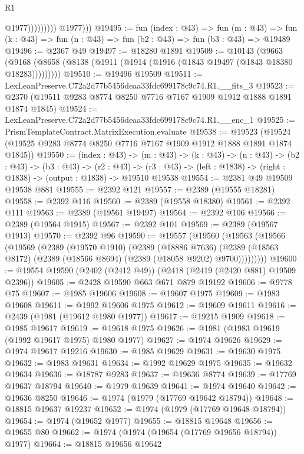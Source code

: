 \begin{lexlean}{R1}
\begin{coremodule}
                            @1977)))))))))
          @1977)))
@19495 := fun (index : @43) =>
  fun (m : @43) => fun (k : @43) => fun (n : @43) => fun (b2 : @43) => fun (b3 : @43) => @19489
@19496 := @2367 @49
@19497 := @18280 @1891
@19509 := @10143
    (@9663 (@9168 (@8658 (@8138 (@1911 (@1914 (@1916 (@1843 @19497 (@1843 @18380 @18283)))))))))
@19510 := @19496 @19509
@19511 := LexLeanPreserve.C72a2d77b5456deaa33fdc699178c9c74.R1.__fits_3
@19523 := @2370 (@19511 @9283 @8774 @8250 @7716 @7167 @1909 @1912 @1888 @1891 @1874 @1845)
@19524 := LexLeanPreserve.C72a2d77b5456deaa33fdc699178c9c74.R1.__enc_1
@19525 := PrismTemplateContract.MatrixExecution.evaluate
@19538 := @19523 (@19524 (@19525 @9283 @8774 @8250 @7716 @7167 @1909 @1912 @1888 @1891 @1874 @1845))
@19550 := (index : @43) ->
  (m : @43) ->
  (k : @43) ->
  (n : @43) ->
  (b2 : @43) ->
  (b3 : @43) ->
  (r2 : @43) -> (r3 : @43) -> (left : @1838) -> (right : @1838) -> (output : @1838) -> @19510 @19538
@19554 := @2381 @49 @19509 @19538 @881
@19555 := @2392 @121
@19557 := @2389 (@19555 @18281)
@19558 := @2392 @116
@19560 := @2389 (@19558 @18380)
@19561 := @2392 @111
@19563 := @2389 (@19561 @19497)
@19564 := @2392 @106
@19566 := @2389 (@19564 @1915)
@19567 := @2392 @101
@19569 := @2389 (@19567 @1913)
@19570 := @2392 @96
@19590 := @19557
    (@19560
      (@19563
        (@19566
          (@19569
            (@2389
              (@19570 @1910)
              (@2389
                (@18886 @7636)
                (@2389 (@18563 @8172) (@2389 (@18566 @8694) (@2389 (@18058 @9202) @9700)))))))))
@19600 := @19554 @19590 (@2402 (@2412 @49)) (@2418 (@2419 (@2420 @881) @19509 @2396))
@19605 := @2428 @19590 @663 @671 @879 @19192
@19606 := @9778 @75
@19607 := @1985 @19606
@19608 := @19607 @1975
@19609 := @1983 @19608
@19611 := @1992 @19606 @1975
@19612 := @19609 @19611
@19616 := @2439 (@1981 (@19612 @1980 @1977))
@19617 := @19215 @1909
@19618 := @1985 @19617
@19619 := @19618 @1975
@19626 := @1981 (@1983 @19619 (@1992 @19617 @1975) @1980 @1977)
@19627 := @1974 @19626
@19629 := @1974 @19617 @19216
@19630 := @1985 @19629
@19631 := @19630 @1975
@19632 := @1983 @19631
@19634 := @1992 @19629 @1975
@19635 := @19632 @19634
@19636 := @18787 @9283
@19637 := @19636 @8774
@19639 := @17769 @19637 @18794
@19640 := @1979 @19639
@19641 := @1974 @19640
@19642 := @19636 @8250
@19646 := @1974 (@1979 (@17769 @19642 @18794))
@19648 := @18815 @19637 @19237
@19652 := @1974 (@1979 (@17769 @19648 @18794))
@19654 := @1974 (@19652 @1977)
@19655 := @18815 @19648
@19656 := @19655 @80
@19662 := @1974 (@1974 (@19654 (@17769 @19656 @18794)) @1977)
@19664 := @18815 @19656 @19642

\end{coremodule}
\end{lexlean}
